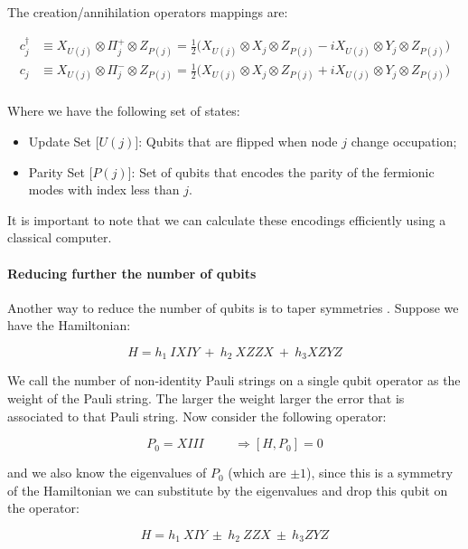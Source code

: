 The creation/annihilation operators mappings are:

\begin{equation}
\begin{split}
    c^\dagger_j & \equiv X_{U(j)} \otimes \Pi_j^+ \otimes Z_{P(j)} = \frac{1}{2} \bigg( X_{U(j)} \otimes X_j \otimes Z_{P(j)} - i X_{U(j)} \otimes Y_j \otimes Z_{P(j)} \bigg) \\
    c_j & \equiv X_{U(j)} \otimes \Pi_j^- \otimes Z_{P(j)} = \frac{1}{2} \bigg( X_{U(j)} \otimes X_j \otimes Z_{P(j)} + i X_{U(j)} \otimes Y_j \otimes Z_{P(j)} \bigg) \\
\end{split}
\end{equation}

Where we have the following set of states:

\begin{itemize}
    \item Update Set [$U(j)$]: Qubits that are flipped when node $j$ change occupation;
    \item Parity Set [$P(j)$]: Set of qubits that encodes the parity of the fermionic modes with index less than $j$.
\end{itemize}

It is important to note that we can calculate these encodings efficiently using a classical computer.

\paragraph{Reducing further the number of qubits} Another way to reduce the number of qubits is to taper symmetries  \citep{bravyi2017tapering}. Suppose we have the Hamiltonian:

\begin{equation*}
    H = h_1 \ IXIY  \ + \ h_2 \ XZZX \ + \ h_3 XZYZ
\end{equation*}

We call the number of non-identity Pauli strings on a single qubit operator as the weight of the Pauli string. The larger the weight larger the error that is associated to that Pauli string. Now consider the following operator:

\begin{equation*}
    P_0 = XIII \hspace{1cm} \Rightarrow [H, P_0] = 0
\end{equation*}

and we also know the eigenvalues of $P_0$ (which are $\pm 1$), since this is a symmetry of the Hamiltonian we can substitute by the eigenvalues and drop this qubit on the operator:

\begin{equation*}
    H = h_1 \ XIY  \ \pm \ h_2 \ ZZX \ \pm \ h_3 ZYZ
\end{equation*}